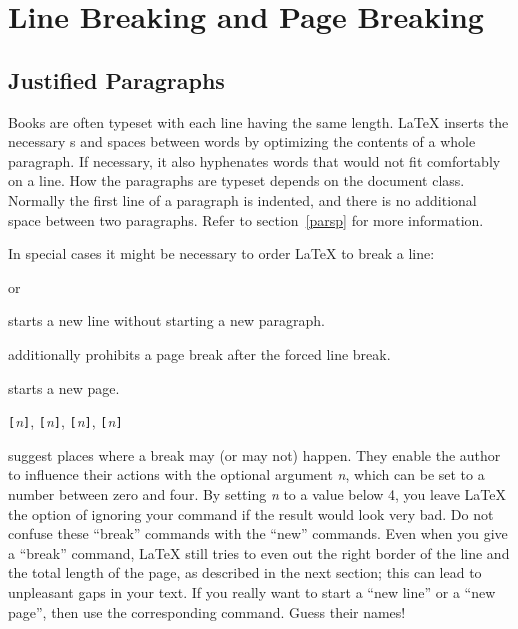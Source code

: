 \section{Line Breaking and Page Breaking}

\subsection{Justified Paragraphs}

Books are often typeset with each line having the same length.
\LaTeX{} inserts the necessary s and spaces between words
by optimizing the contents of a whole paragraph. If necessary, it
also hyphenates words that would not fit comfortably on a line.
How the paragraphs are typeset depends on the document class.
Normally the first line of a paragraph is indented, and there is no
additional space between two paragraphs. Refer to section~\ref{parsp}
for more information.

In special cases it might be necessary to order \LaTeX{} to break a
line:
\begin{lscommand}
\ci{\bs} or 
\end{lscommand}
\noindent starts a new line without starting a new paragraph.

\begin{lscommand}
\ci{\bs*}
\end{lscommand}
\noindent additionally prohibits a page break after the forced
line break.

\begin{lscommand}
\end{lscommand}
\noindent starts a new page.

\begin{lscommand}
\verb|[|\emph{n}\verb|]|,
\verb|[|\emph{n}\verb|]|,
\verb|[|\emph{n}\verb|]|,
\verb|[|\emph{n}\verb|]|
\end{lscommand}
\noindent suggest places where a break may (or may not) happen. They enable the author to influence their
actions with the optional argument \emph{n}, which can be set to a number
between zero and four. By setting \emph{n} to a value below 4, you leave
\LaTeX{} the option of ignoring your command if the result would look very
bad. Do not confuse these ``break'' commands with the ``new'' commands. Even
when you give a ``break'' command, \LaTeX{} still tries to even out the
right border of the line and the total length of the page, as described in
the next section; this can lead to unpleasant gaps in your text.
If you really want to start a ``new line'' or a ``new page'', then use the
corresponding command. Guess their names!


